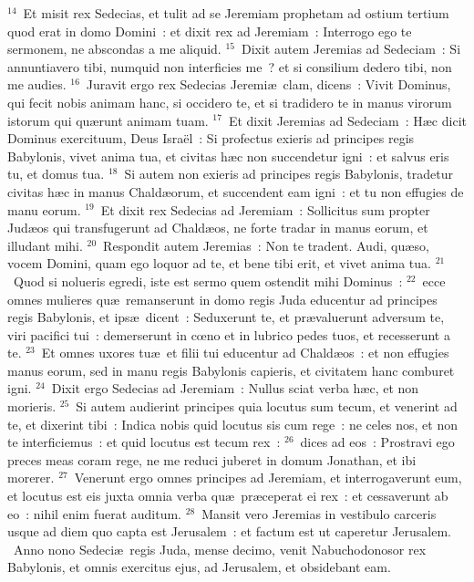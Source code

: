 ${}^{14}$~Et misit rex Sedecias, et tulit ad se Jeremiam prophetam ad ostium tertium quod erat in domo Domini~: et dixit rex ad Jeremiam~: Interrogo ego te sermonem, ne abscondas a me aliquid.
${}^{15}$~Dixit autem Jeremias ad Sedeciam~: Si annuntiavero tibi, numquid non interficies me~? et si consilium dedero tibi, non me audies.
${}^{16}$~Juravit ergo rex Sedecias Jeremi\ae\ clam, dicens~: Vivit Dominus, qui fecit nobis animam hanc, si occidero te, et si tradidero te in manus virorum istorum qui qu\ae runt animam tuam.
${}^{17}$~Et dixit Jeremias ad Sedeciam~: H\ae c dicit Dominus exercituum, Deus Isra\"el~: Si profectus exieris ad principes regis Babylonis, vivet anima tua, et civitas h\ae c non succendetur igni~: et salvus eris tu, et domus tua.
${}^{18}$~Si autem non exieris ad principes regis Babylonis, tradetur civitas h\ae c in manus Chald\ae orum, et succendent eam igni~: et tu non effugies de manu eorum.
${}^{19}$~Et dixit rex Sedecias ad Jeremiam~: Sollicitus sum propter Jud\ae os qui transfugerunt ad Chald\ae os, ne forte tradar in manus eorum, et illudant mihi.
${}^{20}$~Respondit autem Jeremias~: Non te tradent. Audi, qu\ae so, vocem Domini, quam ego loquor ad te, et bene tibi erit, et vivet anima tua.
${}^{21}$~Quod si nolueris egredi, iste est sermo quem ostendit mihi Dominus~:
${}^{22}$~ecce omnes mulieres qu\ae\ remanserunt in domo regis Juda educentur ad principes regis Babylonis, et ips\ae\ dicent~: Seduxerunt te, et pr\ae valuerunt adversum te, viri pacifici tui~: demerserunt in cœno et in lubrico pedes tuos, et recesserunt a te.
${}^{23}$~Et omnes uxores tu\ae\ et filii tui educentur ad Chald\ae os~: et non effugies manus eorum, sed in manu regis Babylonis capieris, et civitatem hanc comburet igni.
${}^{24}$~Dixit ergo Sedecias ad Jeremiam~: Nullus sciat verba h\ae c, et non morieris.
${}^{25}$~Si autem audierint principes quia locutus sum tecum, et venerint ad te, et dixerint tibi~: Indica nobis quid locutus sis cum rege~: ne celes nos, et non te interficiemus~: et quid locutus est tecum rex~:
${}^{26}$~dices ad eos~: Prostravi ego preces meas coram rege, ne me reduci juberet in domum Jonathan, et ibi morerer.
${}^{27}$~Venerunt ergo omnes principes ad Jeremiam, et interrogaverunt eum, et locutus est eis juxta omnia verba qu\ae\ pr\ae ceperat ei rex~: et cessaverunt ab eo~: nihil enim fuerat auditum.
${}^{28}$~Mansit vero Jeremias in vestibulo carceris usque ad diem quo capta est Jerusalem~: et factum est ut caperetur Jerusalem.
~\lettrine[lines=10,image=true,loversize=0.05,lraise=-0.03]{A}{}nno nono Sedeci\ae\ regis Juda, mense decimo, venit Nabuchodonosor rex Babylonis, et omnis exercitus ejus, ad Jerusalem, et obsidebant eam.
